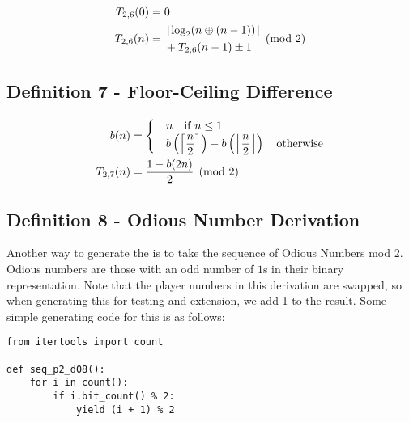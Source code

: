 \documentclass[conference]{IEEEtran}
\begin{document}
\begin{equation}
    \label{eq:p2d06}
    \begin{aligned}
T_{2,6}(0) &= 0 \\
T_{2,6}(n) &= \begin{aligned}[c]
    &\floor{\log_2(n \oplus (n - 1))} \\
    &+ T_{2,6}(n - 1) \pm 1
\end{aligned} \pmod{2}
    \end{aligned}
\end{equation}

\subsection{Definition 7 - Floor-Ceiling Difference}


\begin{equation}
    \label{eq:p2d07}
    \begin{aligned}
      b(n) &= \begin{cases}
          &n \quad \text{if } n \le 1 \\
          &b\left(\ceil{\dfrac{n}{2}}\right) - b\left(\floor{\dfrac{n}{2}}\right) \quad \text{otherwise}
\end{cases} \\
T_{2,7}(n) &= \dfrac{1 - b(2n)}{2} \pmod{2}
    \end{aligned}
\end{equation}


\subsection{Definition 8 - Odious Number Derivation}


Another way to generate the \TMS is to take the sequence of Odious Numbers \cite{OEIS-Odious} mod $2$. Odious numbers are those with an odd number of $1$s in their binary representation. Note that the player numbers in this derivation are swapped, so when generating this for testing and extension, we add 1 to the result. Some simple generating code \cite{repo} for this is as follows:

\begin{lstlisting}[style=pythonstyle]
from itertools import count

def seq_p2_d08():
    for i in count():
        if i.bit_count() % 2:
            yield (i + 1) % 2
\end{lstlisting}
\end{document}
